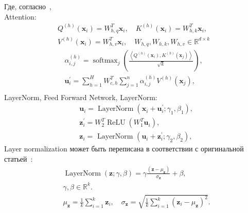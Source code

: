 \newpage
Где, согласно~\cite{thickstun2021transformer},\\
Attention:
\begin{equation}
\begin{aligned}
Q^{(h)}\left(\mathbf{x}_i\right)=W_{h, q}^T \mathbf{x}_i, \quad K^{(h)}\left(\mathbf{x}_i\right)=W_{h, k}^T \mathbf{x}_i, \\ V^{(h)}\left(\mathbf{x}_i\right)=W_{h, v}^T \mathbf{x}_i, \quad W_{h, q}, W_{h, k}, W_{h, v} \in \mathbb{R}^{d \times k} 
\end{aligned}
\end{equation}
\begin{equation}
\begin{aligned}
\alpha_{i,j}^{(h)}=\operatorname{softmax}_j\left(\frac{\left\langle Q^{(h)}\left(\mathbf{x}_i\right), K^{(h)}\left(\mathbf{x}_j\right)\right\rangle}{\sqrt{k}}\right), \\
\mathbf{u}_i^{\prime}=\sum_{h=1}^H W_{c, h}^T \sum_{j=1}^n \alpha_{i, j}^{(h)} V^{(h)}\left(\mathbf{x}_j\right), \\
\end{aligned}
\end{equation}
LayerNorm,
Feed Forward Network,
LayerNorm:
\begin{equation}
\begin{aligned}
&\mathbf{u}_i=\operatorname{LayerNorm}\left(\mathbf{x}_i+\mathbf{u}_i^{\prime} ; \gamma_1, \beta_1\right), \\
& \mathbf{z}_i^{\prime}=W_2^T \operatorname{ReLU}\left(W_1^T \mathbf{u}_i\right), \\
& \mathbf{z}_i=\text { LayerNorm }\left(\mathbf{u}_i+\mathbf{z}_i^{\prime} ; \gamma_2, \beta_2\right) \text {, }
\end{aligned}
\end{equation}
Layer normalization может быть переписана в соответствии с оригинальной статьей~\cite{ba2016layer}:
\begin{equation}
\begin{aligned}
& \operatorname{LayerNorm}(\mathbf{z} ; \gamma, \beta)=\gamma \frac{\left(\mathbf{z}-\mu_{\mathbf{z}}\right)}{\sigma_{\mathbf{z}}}+\beta, \\
& \gamma, \beta \in \mathbb{R}^k . \\
& \mu_{\mathbf{z}}=\frac{1}{k} \sum_{i=1}^k \mathbf{z}_i, \quad \sigma_{\mathbf{z}}=\sqrt{\frac{1}{k} \sum_{i=1}^k\left(\mathbf{z}_i-\mu_{\mathbf{z}}\right)^2} . \\
&
\end{aligned}
\end{equation}

